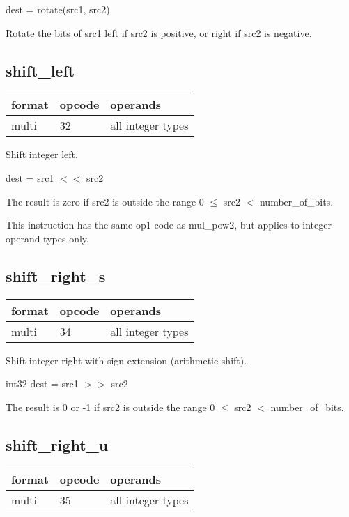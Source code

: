 \documentclass[forwardcom.tex]{subfiles}
\begin{document}
dest = rotate(src1, src2)
\vv

Rotate the bits of src1 left if src2 is positive, or right if src2 is negative.
\vv


\subsection{shift\_left}
\label{table:shiftLeftInstruction}
\begin{tabular}{|p{12mm}|p{15mm}|p{100mm}|}
\hline
\bfseries format & \bfseries opcode & \bfseries operands \\ \hline
multi & 32 & all integer types \\ \hline
\end{tabular}
\vv

Shift integer left.

dest = src1 $<<$ src2
\vv

The result is zero if src2 is outside the range 0 $\leq$ src2 $<$ number\_of\_bits.
\vv

This instruction has the same op1 code as mul\_pow2, but applies to integer operand types only.
\vv


\subsection{shift\_right\_s}
\label{table:shiftRightSInstruction}
\begin{tabular}{|p{12mm}|p{15mm}|p{100mm}|}
\hline
\bfseries format & \bfseries opcode & \bfseries operands \\ \hline
multi & 34 & all integer types \\ \hline
\end{tabular}
\vv

Shift integer right with sign extension (arithmetic shift).
\vv

int32 dest = src1 $>>$ src2
\vv

The result is 0 or -1 if src2 is outside the range 0 $\leq$ src2 $<$ number\_of\_bits.

\vv


\subsection{shift\_right\_u}
\label{table:shiftRightUInstruction}
\begin{tabular}{|p{12mm}|p{15mm}|p{100mm}|}
\hline
\bfseries format & \bfseries opcode & \bfseries operands \\ \hline
multi & 35 & all integer types \\ \hline
\end{tabular}
\vv
\end{document}
